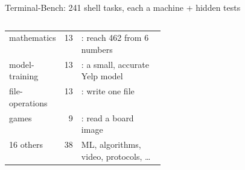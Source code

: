 \begin{frame}{Terminal-Bench: 241 shell tasks, each a machine + hidden tests}
\begin{columns}[T]
\begin{tabularx}{\linewidth}{@{}P{0.3\linewidth}rY@{}}
mathematics & 13 & : reach 462 from 6 numbers\\
model-training & 13 & : a small, accurate Yelp model\\
file-operations & 13 & : write one file\\
games & 9 & : read a board image\\
16 others & 38 & ML, algorithms, video, protocols, \dots\\
\bottomrule
\end{tabularx}
\end{columns}
\end{frame}

